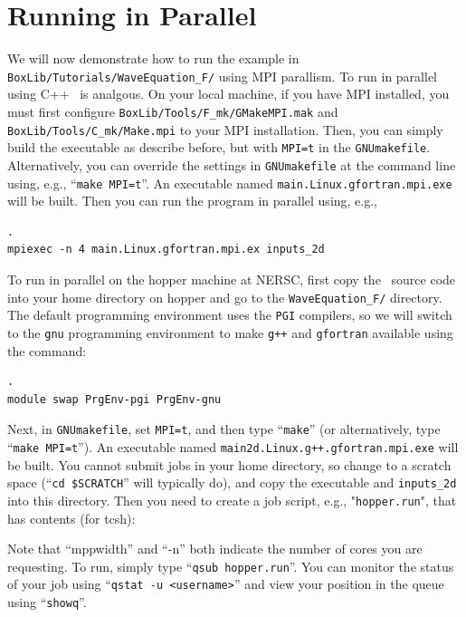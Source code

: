 \section{Running in Parallel}
We will now demonstrate how to run the example in {\tt BoxLib/Tutorials/WaveEquation\_F/}
using MPI parallism.  To run in parallel using C++ \BoxLib\ is analgous.
On your local machine, if you have MPI installed, you must first configure
{\tt BoxLib/Tools/F\_mk/GMakeMPI.mak} and {\tt BoxLib/Tools/C\_mk/Make.mpi}
to your MPI installation.  Then, you 
can simply build the executable as describe before, but with {\tt MPI=t} 
in the {\tt GNUmakefile}.  Alternatively, you can override the settings in 
{\tt GNUmakefile} at the command line using, e.g., ``{\tt make MPI=t}''.  
An executable named {\tt main.Linux.gfortran.mpi.exe} will be built.
Then you can run the program in parallel using, e.g.,
\begin{lstlisting}[backgroundcolor=\color{light-red}].
mpiexec -n 4 main.Linux.gfortran.mpi.ex inputs_2d
\end{lstlisting}

To run in parallel on the hopper machine at NERSC, first copy the \BoxLib\ source code
into your home directory on hopper and go to the {\tt WaveEquation\_F/} directory.
The default programming environment uses the {\tt PGI} compilers, so we will switch to the
{\tt gnu} programming environment to make {\tt g++} and {\tt gfortran} available
using the command:
\begin{lstlisting}[backgroundcolor=\color{light-red}].
module swap PrgEnv-pgi PrgEnv-gnu
\end{lstlisting}
Next, in {\tt GNUmakefile}, set {\tt MPI=t}, and then type ``{\tt make}''
(or alternatively, type ``{\tt make MPI=t}'').
An executable named {\tt main2d.Linux.g++.gfortran.mpi.exe} will be built.
You cannot submit jobs in your home directory, so change to a scratch space
(``{\tt cd \$SCRATCH}'' will typically do), and copy the executable and
{\tt inputs\_2d} into this directory.  Then you need to create a job script,
e.g., "{\tt hopper.run}", that has contents (for tcsh):

Note that ``mppwidth'' and ``-n'' both indicate the number of cores you are requesting.
To run, simply type ``{\tt qsub hopper.run}''.  You can monitor the status of your job
using ``{\tt qstat -u <username>}'' and view your position in the queue 
using ``{\tt showq}''.


